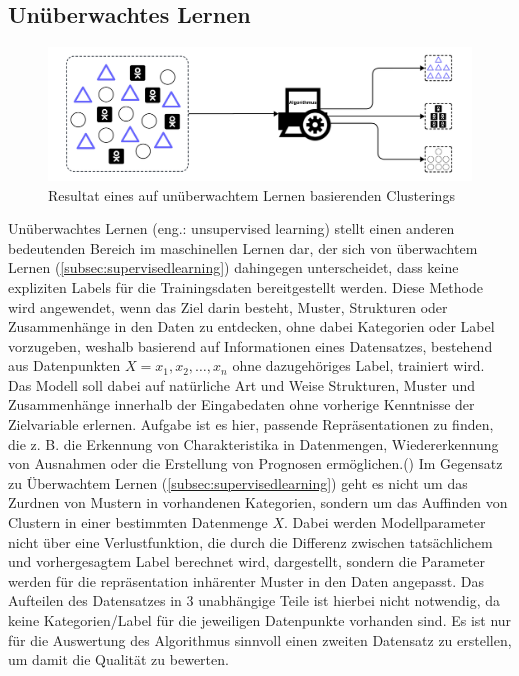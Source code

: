 \subsection{Unüberwachtes Lernen}\label{subsec:unsupervisedlearning}
\begin{figure}[H]
	\centering
	\includegraphics[width=0.8\linewidth]{Bilder/unsupervised_sample.png}
	\caption{Resultat eines auf unüberwachtem Lernen basierenden Clusterings}
\end{figure}
Unüberwachtes Lernen (eng.: unsupervised learning) stellt einen anderen bedeutenden Bereich im maschinellen Lernen dar, der sich von überwachtem Lernen (\ref{subsec:supervisedlearning}) dahingegen unterscheidet, dass keine expliziten Labels für die Trainingsdaten bereitgestellt werden. Diese Methode wird angewendet, wenn das Ziel darin besteht, Muster, Strukturen oder Zusammenhänge in den Daten zu entdecken, ohne dabei Kategorien oder Label vorzugeben, weshalb basierend auf Informationen eines Datensatzes, bestehend aus Datenpunkten \textit{$X = x_1, x_2, \ldots, x_n$} ohne dazugehöriges Label, trainiert wird. Das Modell soll dabei auf natürliche Art und Weise Strukturen, Muster und Zusammenhänge innerhalb der Eingabedaten ohne vorherige Kenntnisse der Zielvariable erlernen. \glqq Aufgabe ist es hier, passende Repräsentationen zu finden, die z. B. die Erkennung von Charakteristika in Datenmengen, Wiedererkennung von Ausnahmen oder die Erstellung von Prognosen ermöglichen.\grqq (\cite[5]{lorenz_reinforcement_2020}) Im Gegensatz zu Überwachtem Lernen (\ref{subsec:supervisedlearning}) geht es nicht um das Zurdnen von Mustern in vorhandenen Kategorien, sondern um das Auffinden von Clustern in einer bestimmten Datenmenge $X$. Dabei werden Modellparameter nicht über eine Verlustfunktion, die durch die Differenz zwischen tatsächlichem und vorhergesagtem Label berechnet wird, dargestellt, sondern die Parameter werden für die repräsentation inhärenter Muster in den Daten angepasst. Das Aufteilen des Datensatzes in 3 unabhängige Teile ist hierbei nicht notwendig, da keine Kategorien/Label für die jeweiligen Datenpunkte vorhanden sind. Es ist nur für die Auswertung des Algorithmus sinnvoll einen zweiten Datensatz zu erstellen, um damit die Qualität zu bewerten.
